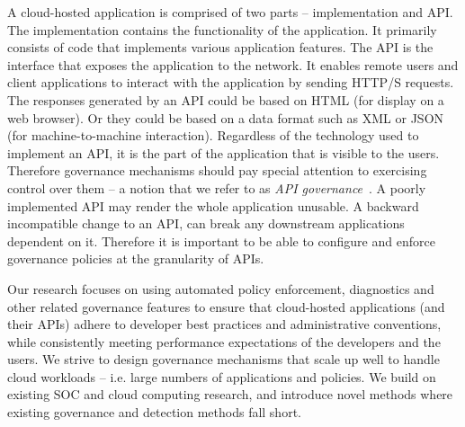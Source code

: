 A cloud-hosted application is comprised of two parts -- implementation and API. The implementation
contains the functionality of the application. It primarily consists of code that implements
various application features. The API is the interface that exposes the application to the
network. It enables remote users and client applications to interact with the application by sending
HTTP/S requests. The responses generated by an API could be based on HTML (for display on a web
browser). Or they could be based on a data format such as XML or JSON (for machine-to-machine 
interaction). Regardless of the technology used to implement an API, it is the part of the application 
that is visible to the users. Therefore governance
mechanisms should pay special attention to exercising control over them -- a notion that we refer
to as \textit{API governance}~\cite{6903538}. A poorly implemented API may render the whole application unusable.
A backward incompatible change to an API, can break any downstream applications dependent on it. 
Therefore it is important to be able to configure and enforce governance policies at the granularity of
APIs.

Our research focuses on using automated policy enforcement, diagnostics and other related 
governance features to ensure that
cloud-hosted applications (and their APIs) adhere to developer best practices 
and administrative conventions, while
consistently meeting performance expectations of the developers and the users. We strive to design
governance mechanisms that scale up well to handle cloud workloads -- i.e. large numbers of applications
and policies. We build on existing SOC and cloud computing research, and introduce novel methods
where existing governance and detection methods fall short. 
